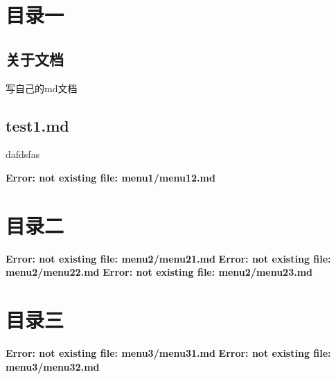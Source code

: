 \chapter{目录一}
\label{index.md}\section{关于文档}
写自己的md文档



\label{menu11.md}\section{test1.md}
dafdsfas



\newpage\label{menu1/menu12.md}\textbf{Error: not existing file: menu1/menu12.md}\newpage
\chapter{目录二}
\newpage\label{menu2/menu21.md}\textbf{Error: not existing file: menu2/menu21.md}\newpage
\newpage\label{menu2/menu22.md}\textbf{Error: not existing file: menu2/menu22.md}\newpage
\newpage\label{menu2/menu23.md}\textbf{Error: not existing file: menu2/menu23.md}\newpage
\chapter{目录三}
\newpage\label{menu3/menu31.md}\textbf{Error: not existing file: menu3/menu31.md}\newpage
\newpage\label{menu3/menu32.md}\textbf{Error: not existing file: menu3/menu32.md}\newpage
